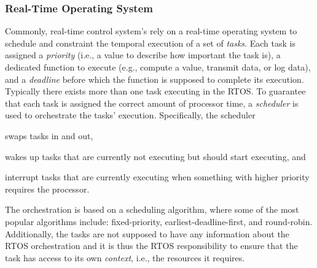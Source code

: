 \subsubsection{Real-Time Operating System}%
%
Commonly, real-time control system's rely on a real-time operating system to schedule and constraint the temporal execution of a set of \emph{tasks}.
Each task is assigned a \emph{priority} (i.e., a value to describe how important the task is), a dedicated function to execute (e.g., compute a value, transmit data, or log data), and a \emph{deadline} before which the function is supposed to complete its execution.
Typically there exists more than one task executing in the RTOS.
To guarantee that each task is assigned the correct amount of processor time, a \emph{scheduler} is used to orchestrate the tasks' execution.
Specifically, the scheduler
\begin{enumerate*}[label = (\roman*)]
    \item swaps tasks in and out,
    \item wakes up tasks that are currently not executing but should start executing, and
    \item interrupt tasks that are currently executing when something with higher priority requires the processor.
\end{enumerate*}
The orchestration is based on a scheduling algorithm, where some of the most popular algorithms include: fixed-priority, earliest-deadline-first, and round-robin.
Additionally, the tasks are not supposed to have any information about the RTOS orchestration and it is thus the RTOS responsibility to ensure that the task has access to its own \emph{context}, i.e., the resources it requires. 

